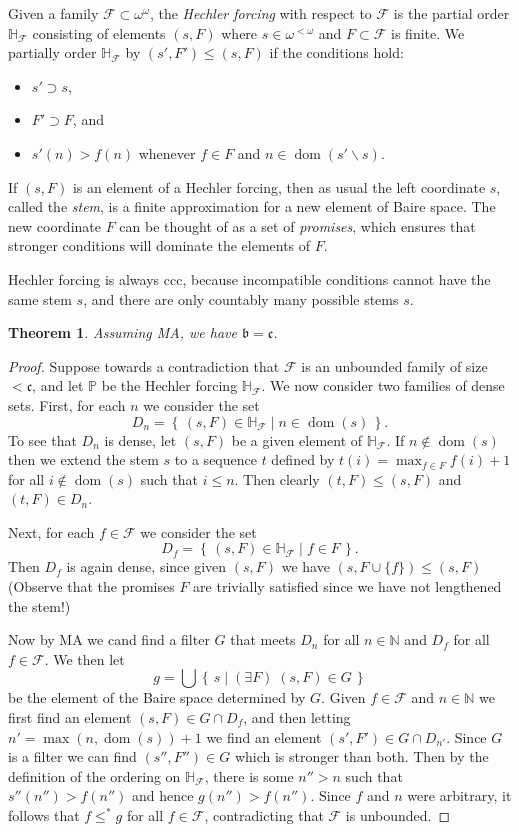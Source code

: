 \documentclass[11pt,oneside]{amsbook}
\newcommand{\set}[1]{\left\{\,#1\,\right\}}
\newcommand{\NN}{\mathbb N}
\newcommand{\PP}{\mathbb P}
\DeclareMathOperator{\dom}{dom}
\theoremstyle{definition}
\theoremstyle{plain}
\newtheorem{thm}{Theorem}[section]
\theoremstyle{definition}
\theoremstyle{remark}
\numberwithin{equation}{section}
\numberwithin{figure}{section}
\begin{document}
Given a family $\mathcal F\subset\omega^\omega$, the \emph{Hechler forcing} with respect to $\mathcal F$ is the partial order $\mathbb H_{\mathcal F}$ consisting of elements $(s,F)$ where $s\in\omega^{<\omega}$ and $F\subset\mathcal F$ is finite. We partially order $\mathbb H_{\mathcal F}$ by $(s',F')\leq(s,F)$ if the conditions hold:
\begin{itemize}
\item $s'\supset s$,
\item $F'\supset F$, and
\item $s'(n)>f(n)$ whenever $f\in F$ and $n\in\dom(s'\smallsetminus s)$.
\end{itemize}
If $(s,F)$ is an element of a Hechler forcing, then as usual the left coordinate $s$, called the \emph{stem}, is a finite approximation for a new element of Baire space. The new coordinate $F$ can be thought of as a set of \emph{promises}, which ensures that stronger conditions will dominate the elements of $F$.

Hechler forcing is always ccc, because incompatible conditions cannot have the same stem $s$, and there are only countably many possible stems $s$.

\begin{thm}
  Assuming MA, we have $\mathfrak b=\mathfrak c$.
\end{thm}

\begin{proof}
  Suppose towards a contradiction that $\mathcal F$ is an unbounded family of size $<\mathfrak c$, and let $\PP$ be the Hechler forcing $\mathbb H_{\mathcal F}$. We now consider two families of dense sets. First, for each $n$ we consider the set
  \[D_n=\set{(s,F)\in\mathbb H_{\mathcal F}\mid n\in\dom(s)}\text{.}
  \]
  To see that $D_n$ is dense, let $(s,F)$ be a given element of $\mathbb H_{\mathcal F}$. If $n\notin\dom(s)$ then we extend the stem $s$ to a sequence $t$ defined by $t(i)=\max_{f\in F}f(i)+1$ for all $i\notin\dom(s)$ such that $i\leq n$. Then clearly $(t,F)\leq(s,F)$ and $(t,F)\in D_n$.

  Next, for each $f\in\mathcal F$ we consider the set
  \[D_f=\set{(s,F)\in\mathbb H_{\mathcal F}\mid f\in F}\text{.}
  \]
  Then $D_f$ is again dense, since given $(s,F)$ we have $(s,F\cup\{f\})\leq(s,F)$ (Observe that the promises $F$ are trivially satisfied since we have not lengthened the stem!)

  Now by MA we cand find a filter $G$ that meets $D_n$ for all $n\in\NN$ and  $D_f$ for all $f\in\mathcal F$. We then let
  \[g=\bigcup\set{s\mid(\exists F)\;(s,F)\in G}
  \]
  be the element of the Baire space determined by $G$. Given $f\in\mathcal F$ and $n\in\NN$ we first find an element $(s,F)\in G\cap D_f$, and then letting $n'=\max(n,\dom(s))+1$ we find an element $(s',F')\in G\cap D_{n'}$. Since $G$ is a filter we can find $(s'',F'')\in G$ which is stronger than both. Then by the definition of the ordering on $\mathbb H_{\mathcal F}$, there is some $n''>n$ such that $s''(n'')>f(n'')$ and hence $g(n'')>f(n'')$. Since $f$ and $n$ were arbitrary, it follows that $f\leq^*g$ for all $f\in\mathcal F$, contradicting that $\mathcal F$ is unbounded.
\end{proof}
\end{document}
